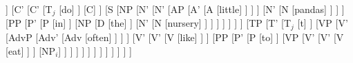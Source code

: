 \documentclass{article}
\begin{document}
	\begin{forest}
		[CP
			[NP$_i$
				[what]
			]
			[C'
				[C'
					[T$_j$
						[do]
					]
					[C]
				]
				[S
					[NP
						[N'
							[N'
								[AP
									[A'
										[A
											[little]
										]
									]
								]
								[N'
									[N
										[pandas]
									]
								]
							]
							[PP
								[P'
									[P
										[in]
									]
									[NP
										[D
											[the]
										]
										[N'
											[N
												[nursery]
											]
										]
									]
								]
							]
						]
					]
					[TP
						[T'
							[T$_j$
								[t]
							]
							[VP
								[V'
									[AdvP
										[Adv'
											[Adv
												[often]
											]
										]
									]
									[V'
										[V'
											[V
												[like]
											]
										]
										[PP
											[P'
												[P
													[to]
												]
												[VP
													[V'
														[V'
															[V
																[eat]
															]
														]
														[NP$_i$]
													]
												]
											]
										]
									]
								]
							]
						]
					]
				]
			]
		]
	\end{forest}
\end{document}
